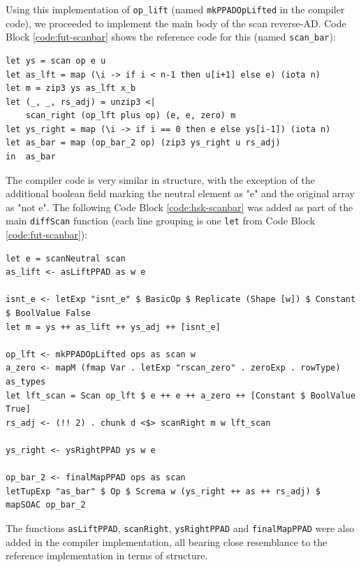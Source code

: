\documentclass{article}
\newenvironment{code}{\captionsetup{type=listing}}{}
\begin{document}
Using this implementation of \lstinline{op_lift} (named \lstinline{mkPPADOpLifted} in the compiler code), we proceeded to implement the main body of the scan reverse-AD. Code Block \ref{code:fut-scanbar} shows the reference code for this (named \lstinline{scan_bar}):
\newpage
\begin{code}
	\begin{verbatim}
let ys = scan op e u
let as_lft = map (\i -> if i < n-1 then u[i+1] else e) (iota n)
let m = zip3 ys as_lft x_b
let (_, _, rs_adj) = unzip3 <|
    scan_right (op_lft plus op) (e, e, zero) m
let ys_right = map (\i -> if i == 0 then e else ys[i-1]) (iota n)
let as_bar = map (op_bar_2 op) (zip3 ys_right u rs_adj)
in  as_bar
\end{verbatim}
	\caption{Reference Futhark code for \lstinline{scan_bar} (main reverse AD fuction).}
	\label{code:fut-scanbar}
\end{code}
\vspace{0.3cm}
The compiler code is very similar in structure, with the exception of the additional boolean field marking the neutral element as "e" and the original array as "not e". The following Code Block \ref{code:hsk-scanbar} was added as part of the main \lstinline{diffScan} function (each line grouping is one \lstinline{let} from Code Block \ref{code:fut-scanbar}):
\begin{code}
	\begin{verbatim}
let e = scanNeutral scan
as_lift <- asLiftPPAD as w e

isnt_e <- letExp "isnt_e" $ BasicOp $ Replicate (Shape [w]) $ Constant $ BoolValue False
let m = ys ++ as_lift ++ ys_adj ++ [isnt_e]

op_lft <- mkPPADOpLifted ops as scan w
a_zero <- mapM (fmap Var . letExp "rscan_zero" . zeroExp . rowType) as_types
let lft_scan = Scan op_lft $ e ++ e ++ a_zero ++ [Constant $ BoolValue True]
rs_adj <- (!! 2) . chunk d <$> scanRight m w lft_scan

ys_right <- ysRightPPAD ys w e

op_bar_2 <- finalMapPPAD ops as scan
letTupExp "as_bar" $ Op $ Screma w (ys_right ++ as ++ rs_adj) $ mapSOAC op_bar_2
\end{verbatim}
	\caption{Haskell code for \lstinline{scan_bar} (main reverse AD fuction). \lstinline{w} is the length of the arrays in \lstinline{as}.\\}
	\label{code:hsk-scanbar}
\end{code}
\vspace{0.3cm}
The functions \lstinline{asLiftPPAD}, \lstinline{scanRight}, \lstinline{ysRightPPAD} and \lstinline{finalMapPPAD} were also added in the compiler implementation, all bearing close resemblance to the reference implementation in terms of structure.
\end{document}
